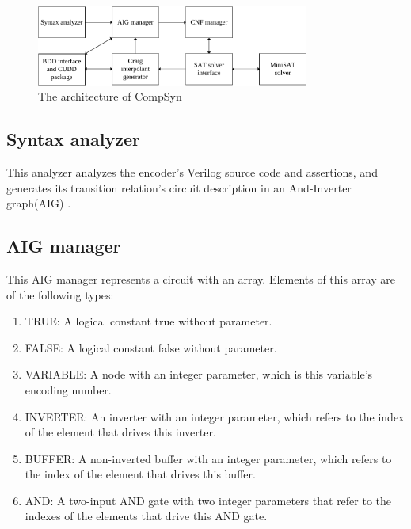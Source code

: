 \documentclass[runningheads,a4paper]{llncs}
\begin{document}
\begin{figure}[b]
\centering
\includegraphics[width=0.8\textwidth]{arch}
\caption{The architecture of CompSyn}
\label{fig_arch}
\end{figure}

\subsection{Syntax analyzer}

This analyzer analyzes the encoder's Verilog source code and assertions,
and generates its transition relation's circuit description in an And-Inverter graph(AIG) \cite{aig}.

\subsection{AIG manager}

This AIG manager represents a circuit with an array.
Elements of this array are of the following types:

\begin{enumerate}
\item TRUE: A logical constant true without parameter.
\item FALSE: A logical constant false without parameter.
\item VARIABLE: A node with an integer parameter,
which is this variable's encoding number.
\item INVERTER: An inverter with an integer parameter,
which refers to the index of the element that drives this inverter.
\item BUFFER:   A non-inverted buffer with an integer parameter,
which refers to the index of the element that drives this buffer.
\item AND: A two-input AND gate with two integer parameters that refer to the indexes of the elements that drive this AND gate.
\end{enumerate}
\end{document}
